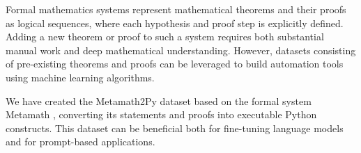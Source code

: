 \hspace{\parindent} Formal mathematics systems represent mathematical theorems and their proofs as logical sequences, where each
hypothesis and proof step is explicitly defined.
Adding a new theorem or proof to such a system requires both substantial manual work and deep mathematical understanding.
 However, datasets consisting of pre-existing theorems and proofs can be leveraged to build automation tools using machine learning algorithms.

We have created the Metamath2Py dataset based on the formal system Metamath \cite{metamath}, converting its
statements and proofs into executable Python constructs. This dataset can be beneficial both for fine-tuning language
models and for prompt-based applications.
